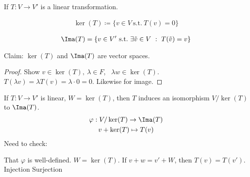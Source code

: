 \documentclass[class=scrartcl, crop=false]{standalone}
\begin{document}
If $T: V \to V'$ is a linear transformation.
\begin{definition}[Kernel]
  \begin{gather*}
    \ker(T) \coloneqq \{v \in V \ \text{s.t.} \ T(v) = 0\}
  \end{gather*} 
\end{definition} 
\begin{definition}[Image]
  \begin{gather*}
    \Ima(T) = \{v \in V' \ \text{s.t.} \ \exists \tilde{v} \in V \ : \ T(\tilde{v}) = v\}
  \end{gather*} 
\end{definition} 
Claim: $\ker(T)$ and $\Ima(T)$ are vector spaces.

\begin{proof}
  Show $v \in \ker(T), \ \lambda \in F$, \ $\lambda w \in \ker(T)$. $T(\lambda v) = \lambda T(v) = \lambda \cdot 0 = 0$. Likewise for image.
\end{proof}  %
If $T: V \to V'$ is linear, $W = \ker(T)$, then $T$ induces an isomorphism $V / \ker(T)$ to $\Ima(T)$.
\begin{gather*}
  \varphi: V / \ker(T) \to \Ima(T) \\
  v + \ker(T) \mapsto T(v)
\end{gather*} 
Need to check:
\begin{enumerate}
  \ii
  That $\varphi$ is well-defined. $W = \ker(T)$. If $v + w = v' + W$, then $T(v) = T(v')$.
  \ii
  Injection
  \ii
  Surjection
\end{enumerate} 
\end{document}
